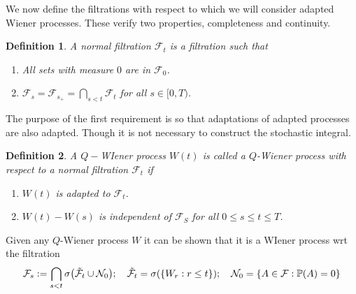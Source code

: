 \documentclass[12pt]{article}
\newcommand{\ff}{{\mathcal F}}
\newcommand{\PP}{{\mathbb P}}
\newtheorem{definition}{Definition}
\begin{document}
We now define the filtrations with respect to which we will consider adapted Wiener processes. These verify two properties, completeness and continuity.
\begin{definition}
	A \emph{normal filtration} $\mathcal{F}_t$ is a filtration such that
	\begin{enumerate}
		\item All sets with measure $0$ are in $\mathcal{F}_0$.
		\item $\ff_s=\ff_{s_+}=\bigcap_{s<t}\ff_t$ for all $s\in [0,T)$.
	\end{enumerate}
\end{definition}
The purpose of the first requirement is so that adaptations of adapted processes are also adapted. Though it is not necessary to construct the stochastic integral.
\begin{definition}
	A $Q-$WIener process $W(t)$ is called a $Q$-Wiener process with respect to a normal filtration $\mathcal{F}_t$ if
	\begin{enumerate}
		\item $W(t)$ is adapted to $\mathcal{F}_t$.
		\item $W(t)-W(s)$ is independent of $\ff_S$ for all $0\leq s\leq t\leq T$.
	\end{enumerate}
\end{definition}
Given any $Q$-Wiener process $W$ it can be shown that it is a WIener process wrt the filtration
\begin{equation*}
	\mathcal{F}_s:=\bigcap_{s<t}\sigma\qty(\tilde{\ff}_t\cup\mathcal{N}_0);\quad \tilde{\ff}_t=\sigma(\{W_r:r\leq t\});\quad \mathcal{N}_0=\{ A\in\ff:\PP(A)=0\}
\end{equation*}
\newpage
\end{document}
